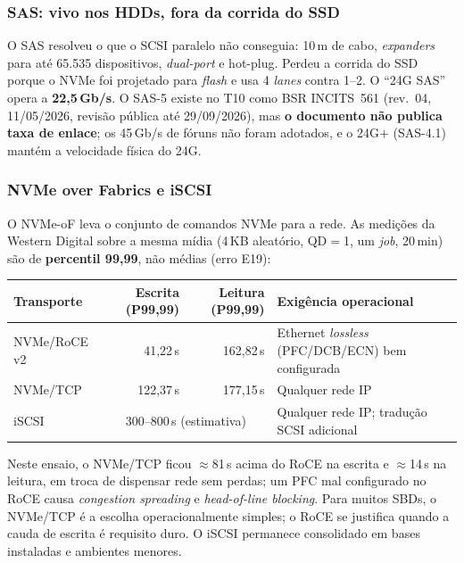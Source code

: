 \documentclass[11pt,a4paper]{article}
\newcommand{\us}{\,\textmu s}
\begin{document}
\subsubsection*{SAS: vivo nos HDDs, fora da corrida do SSD}

O SAS resolveu o que o SCSI paralelo não conseguia: 10\,m de cabo, \emph{expanders} para até
65.535 dispositivos, \emph{dual-port} e hot-plug. Perdeu a corrida do SSD porque o NVMe foi
projetado para \emph{flash} e usa 4 \emph{lanes} contra 1--2. O ``24G SAS'' opera a
\textbf{22,5\,Gb/s}. O SAS-5 existe no T10 como BSR INCITS~561 (rev.~04, 11/05/2026, revisão
pública até 29/09/2026), mas \textbf{o documento não publica taxa de enlace}; os 45\,Gb/s de
fóruns não foram adotados, e o 24G$+$ (SAS-4.1) mantém a velocidade física do 24G.

\subsubsection*{NVMe over Fabrics e iSCSI}

O NVMe-oF leva o conjunto de comandos NVMe para a rede. As medições da Western Digital sobre a
mesma mídia (4\,KB aleatório, QD$=$1, um \emph{job}, 20\,min) são de \textbf{percentil 99,99},
não médias (erro E19):

\begin{center}\small
\begin{tabular}{@{}lrrp{6.2cm}@{}}
\toprule
\textbf{Transporte} & \textbf{Escrita (P99,99)} & \textbf{Leitura (P99,99)} & \textbf{Exigência operacional} \\
\midrule
NVMe/RoCE v2 & 41,22\us  & 162,82\us & Ethernet \emph{lossless} (PFC/DCB/ECN) bem configurada \\
NVMe/TCP     & 122,37\us & 177,15\us & Qualquer rede IP \\
iSCSI        & \multicolumn{2}{c}{300--800\us{} (estimativa)} & Qualquer rede IP; tradução SCSI adicional \\
\bottomrule
\end{tabular}
\end{center}

Neste ensaio, o NVMe/TCP ficou $\approx$81\us{} acima do RoCE na escrita e $\approx$14\us{} na
leitura, em troca de dispensar rede sem perdas; um PFC mal configurado no RoCE causa
\emph{congestion spreading} e \emph{head-of-line blocking}. Para muitos SBDs, o NVMe/TCP é a
escolha operacionalmente simples; o RoCE se justifica quando a cauda de escrita é requisito
duro. O iSCSI permanece consolidado em bases instaladas e ambientes menores.
\end{document}
